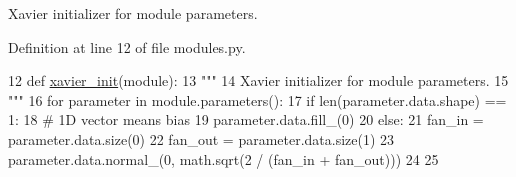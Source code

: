 \begin{DoxyVerb}Xavier initializer for module parameters.
\end{DoxyVerb}
 

Definition at line 12 of file modules.\+py.


\begin{DoxyCode}
12 \textcolor{keyword}{def }\hyperlink{namespaceprojects_1_1taskntalk_1_1modules_a483197f0d561a3d1ef7d04a2de70e571}{xavier\_init}(module):
13     \textcolor{stringliteral}{"""}
14 \textcolor{stringliteral}{    Xavier initializer for module parameters.}
15 \textcolor{stringliteral}{    """}
16     \textcolor{keywordflow}{for} parameter \textcolor{keywordflow}{in} module.parameters():
17         \textcolor{keywordflow}{if} len(parameter.data.shape) == 1:
18             \textcolor{comment}{# 1D vector means bias}
19             parameter.data.fill\_(0)
20         \textcolor{keywordflow}{else}:
21             fan\_in = parameter.data.size(0)
22             fan\_out = parameter.data.size(1)
23             parameter.data.normal\_(0, math.sqrt(2 / (fan\_in + fan\_out)))
24 
25 
\end{DoxyCode}
